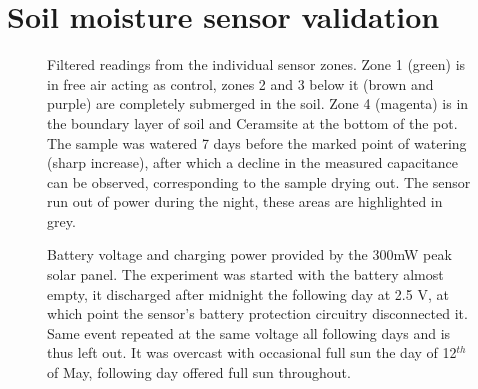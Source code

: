 \section{Soil moisture sensor validation}

\begin{figure}[p]
    
    \caption{\label{fig:sensor-log}Filtered readings from the individual sensor zones. Zone 1 (green) is in free air acting as control, zones 2 and 3 below it (brown and purple) are completely submerged in the soil. Zone 4 (magenta) is in the boundary layer of soil and Ceramsite at the bottom of the pot. The sample was watered 7 days before the marked point of watering (sharp increase), after which a decline in the measured capacitance can be observed, corresponding to the sample drying out. The sensor run out of power during the night, these areas are highlighted in grey.}
\end{figure}

\begin{figure}[p]
    
    \caption{\label{fig:power-log}Battery voltage and charging power provided by the 300mW peak solar panel. The experiment was started with the battery almost empty, it discharged after midnight the following day at 2.5 V, at which point the sensor's battery protection circuitry disconnected it. Same event repeated at the same voltage all following days and is thus left out. It was overcast with occasional full sun the day of 12$^{th}$ of May, following day offered full sun throughout.}
\end{figure}


